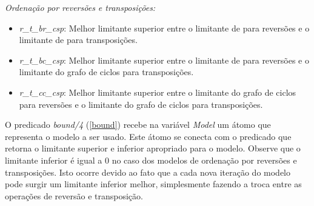 \textit{Ordenação por reversões e transposições:} 
\begin{itemize}
\item{\textit{r\_t\_br\_csp}: 
Melhor limitante superior entre o limitante de \bkp{} para reversões e
o limitante de \bkp{} para transposições.}
\item{\textit{r\_t\_bc\_csp}:
Melhor limitante superior entre o limitante de \bkp{} para reversões e
o limitante do grafo de ciclos para transposições.}
\item{\textit{r\_t\_cc\_csp}: 
Melhor limitante superior entre o limitante do grafo de ciclos para
reversões e o limitante do grafo de ciclos para transposições.}
\end{itemize}

O predicado \textit{bound/4} (\ref{bound}) recebe na
variável \textit{Model} um átomo que representa o modelo a ser
usado. Este átomo se conecta com o predicado que retorna o limitante
superior e inferior apropriado para o modelo. Observe que o limitante
inferior é igual a $0$ no caso dos modelos de ordenação por reversões
e transposições. Isto ocorre devido ao fato que a cada nova iteração
do modelo pode surgir um limitante inferior melhor, simplesmente
fazendo a troca entre as operações de reversão e transposição.
